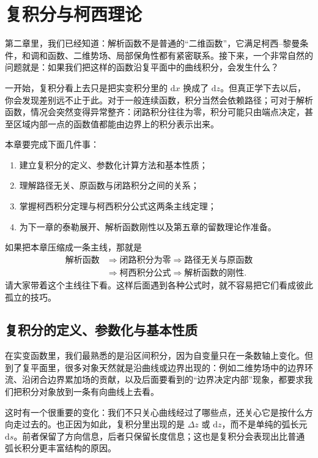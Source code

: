 
\chapter{复积分与柯西理论}

\begin{wulibj}[本章导读]
第二章里，我们已经知道：解析函数不是普通的``二维函数''，它满足柯西--黎曼条件，和调和函数、二维势场、局部保角性都有紧密联系。接下来，一个非常自然的问题就是：如果我们把这样的函数沿复平面中的曲线积分，会发生什么？

一开始，复积分看上去只是把实变积分里的 $\mathrm{d}x$ 换成了 $\mathrm{d}z$。但真正学下去以后，你会发现差别远不止于此。对于一般连续函数，积分当然会依赖路径；可对于解析函数，情况会突然变得异常整齐：闭路积分往往为零，积分可能只由端点决定，甚至区域内部一点的函数值都能由边界上的积分表示出来。

本章要完成下面几件事：
\begin{enumerate}
    \item 建立复积分的定义、参数化计算方法和基本性质；
    \item 理解路径无关、原函数与闭路积分之间的关系；
    \item 掌握柯西积分定理与柯西积分公式这两条主线定理；
    \item 为下一章的泰勒展开、解析函数刚性以及第五章的留数理论作准备。
\end{enumerate}

如果把本章压缩成一条主线，那就是
\[
    \begin{aligned}
        \text{解析函数}
        &\Longrightarrow \text{闭路积分为零}
        \Longrightarrow \text{路径无关与原函数} \\
        &\Longrightarrow \text{柯西积分公式}
        \Longrightarrow \text{解析函数的刚性}.
    \end{aligned}
\]
请大家带着这个主线往下看。这样后面遇到各种公式时，就不容易把它们看成彼此孤立的技巧。
\end{wulibj}

\section{复积分的定义、参数化与基本性质}

\begin{wulibj}[为什么会出现沿曲线的积分]
在实变函数里，我们最熟悉的是沿区间积分，因为自变量只在一条数轴上变化。但到了复平面里，很多对象天然就是沿曲线或边界出现的：例如二维势场中的边界环流、沿闭合边界累加场的贡献，以及后面要看到的``边界决定内部''现象，都要求我们把积分对象放到一条有向曲线上去看。

这时有一个很重要的变化：我们不只关心曲线经过了哪些点，还关心它是按什么方向走过去的。也正因为如此，复积分里出现的是 $\Delta z$ 或 $\mathrm{d}z$，而不是单纯的弧长元 $\mathrm{d}s$。前者保留了方向信息，后者只保留长度信息；这也是复积分会表现出比普通弧长积分更丰富结构的原因。
\end{wulibj}

